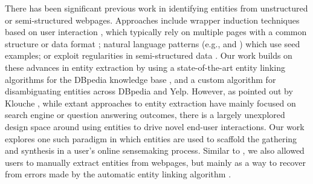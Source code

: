 There has been significant previous work in identifying entities from unstructured or semi-structured webpages. Approaches include wrapper induction techniques based on user interaction \cite{thresher}, which typically rely on multiple pages with a common structure or data format \cite{pasupat2014zero}; natural language patterns (e.g., \cite{hearst1992automatic} and \cite{fader2011identifying}) which use seed examples; or exploit regularities in semi-structured data \cite{thresher}. Our work builds on these advances in entity extraction by using a state-of-the-art entity linking algorithms for the DBpedia knowledge base \cite{spotlight,dbpedia}, and a custom algorithm for disambiguating entities across DBpedia and Yelp. However, as pointed out by Klouche \cite{klouche2018hyperlinks}, while extant approaches to entity extraction have mainly focused on search engine or question answering outcomes, there is a largely unexplored design space around using entities to drive novel end-user interactions. Our work explores one such paradigm in which entities are used to scaffold the gathering and synthesis in a user's online sensemaking process. Similar to \cite{thresher}, we also allowed users to manually extract entities from webpages, but mainly as a way to recover from errors made by the automatic entity linking algorithm \cite{spotlight}.

